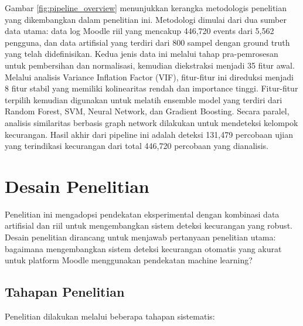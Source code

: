 Gambar \ref{fig:pipeline_overview} menunjukkan kerangka metodologis penelitian yang dikembangkan dalam penelitian ini. Metodologi dimulai dari dua sumber data utama: data log Moodle riil yang mencakup 446,720 events dari 5,562 pengguna, dan data artifisial yang terdiri dari 800 sampel dengan ground truth yang telah didefinisikan. Kedua jenis data ini melalui tahap pra-pemrosesan untuk pembersihan dan normalisasi, kemudian diekstraksi menjadi 35 fitur awal. Melalui analisis Variance Inflation Factor (VIF), fitur-fitur ini direduksi menjadi 8 fitur stabil yang memiliki kolinearitas rendah dan importance tinggi. Fitur-fitur terpilih kemudian digunakan untuk melatih ensemble model yang terdiri dari Random Forest, SVM, Neural Network, dan Gradient Boosting. Secara paralel, analisis similaritas berbasis graph network dilakukan untuk mendeteksi kelompok kecurangan. Hasil akhir dari pipeline ini adalah deteksi 131,479 percobaan ujian yang terindikasi kecurangan dari total 446,720 percobaan yang dianalisis.

\section{Desain Penelitian}
\label{sec:desainPenelitian}
Penelitian ini mengadopsi pendekatan eksperimental dengan kombinasi data artifisial dan riil untuk mengembangkan sistem deteksi kecurangan yang robust. Desain penelitian dirancang untuk menjawab pertanyaan penelitian utama: bagaimana mengembangkan sistem deteksi kecurangan otomatis yang akurat untuk platform Moodle menggunakan pendekatan machine learning?

\subsection{Tahapan Penelitian}
Penelitian dilakukan melalui beberapa tahapan sistematis:

